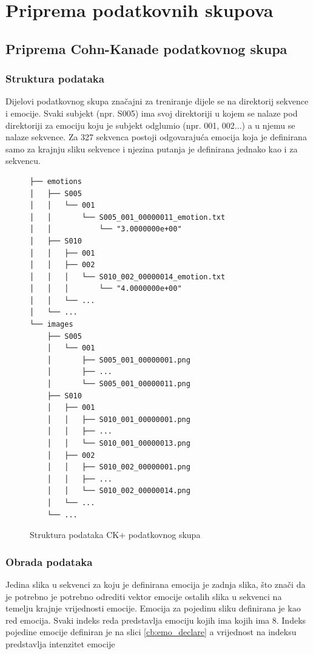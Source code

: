 \documentclass[times, utf8, zavrsni,numeric,pstricks]{fer}
\begin{document}
\section{Priprema podatkovnih skupova}\label{npy_preprocess}
\subsection{Priprema Cohn-Kanade podatkovnog skupa}
\subsubsection{Struktura podataka}

Dijelovi podatkovnog skupa značajni za treniranje dijele se na direktorij sekvence i emocije. Svaki subjekt (npr. S005) ima svoj direktoriji u kojem se nalaze pod direktoriji za emociju koju je subjekt odglumio (npr. 001, 002...) a u njemu se nalaze sekvence. Za 327 sekvenca postoji odgovarajuća emocija koja je definirana samo za krajnju sliku sekvence i njezina putanja je definirana jednako kao i za sekvencu.

\pagebreak

\begin{figure}[H]
\centering
\begin{Verbatim}[fontsize=\small]
├── emotions
│   ├── S005
│   │   └── 001
│   │       └── S005_001_00000011_emotion.txt
│   │       	└── "3.0000000e+00"
│   ├── S010
│   │   ├── 001
│   │   ├── 002
│   │   │   └── S010_002_00000014_emotion.txt
│   │   │   	└── "4.0000000e+00"
│   │   └── ...
│   └── ...
└── images
    ├── S005
    │   └── 001
    │       ├── S005_001_00000001.png
    │       ├── ...
    │       └── S005_001_00000011.png
    ├── S010
    │   ├── 001
    │   │   ├── S010_001_00000001.png
    │   │   ├── ...
    │   │   └── S010_001_00000013.png
    │   ├── 002
    │   │   ├── S010_002_00000001.png
    │   │   ├── ...
    │   │   └── S010_002_00000014.png
    │   └── ...
    └── ...

\end{Verbatim}
\caption{Struktura podataka CK+ podatkovnog skupa}
\label{cb:npy_tree}
\end{figure}

\subsubsection{Obrada podataka}
Jedina slika u sekvenci za koju je definirana emocija je zadnja slika, što znači da je potrebno je potrebno odrediti vektor emocije ostalih slika u sekvenci na temelju krajnje vrijednosti emocije. Emocija za pojedinu sliku definirana je kao red emocija. Svaki indeks reda predstavlja emociju kojih ima kojih ima 8. Indeks pojedine emocije definiran je na slici \ref{cb:emo_declare} a vrijednost na indeksu predstavlja intenzitet emocije
\end{document}
